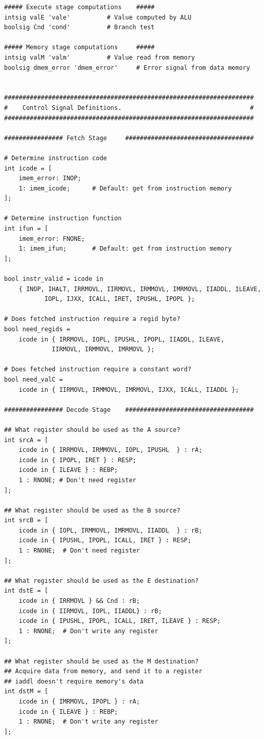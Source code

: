 \documentclass{article}
\begin{document}
\begin{lstlisting}[caption={}]
##### Execute stage computations	#####
intsig valE	'vale'			# Value computed by ALU
boolsig Cnd	'cond'			# Branch test

##### Memory stage computations		#####
intsig valM	'valm'			# Value read from memory
boolsig dmem_error 'dmem_error'		# Error signal from data memory


####################################################################
#    Control Signal Definitions.                                   #
####################################################################

################ Fetch Stage     ###################################

# Determine instruction code
int icode = [
	imem_error: INOP;
	1: imem_icode;		# Default: get from instruction memory
];

# Determine instruction function
int ifun = [
	imem_error: FNONE;
	1: imem_ifun;		# Default: get from instruction memory
];

bool instr_valid = icode in
	{ INOP, IHALT, IRRMOVL, IIRMOVL, IRMMOVL, IMRMOVL, IIADDL, ILEAVE,
	       IOPL, IJXX, ICALL, IRET, IPUSHL, IPOPL };

# Does fetched instruction require a regid byte?
bool need_regids =
	icode in { IRRMOVL, IOPL, IPUSHL, IPOPL, IIADDL, ILEAVE,
		     IIRMOVL, IRMMOVL, IMRMOVL };

# Does fetched instruction require a constant word?
bool need_valC =
	icode in { IIRMOVL, IRMMOVL, IMRMOVL, IJXX, ICALL, IIADDL };

################ Decode Stage    ###################################

## What register should be used as the A source?
int srcA = [
	icode in { IRRMOVL, IRMMOVL, IOPL, IPUSHL  } : rA;
	icode in { IPOPL, IRET } : RESP;
	icode in { ILEAVE } : REBP;
	1 : RNONE; # Don't need register
];

## What register should be used as the B source?
int srcB = [
	icode in { IOPL, IRMMOVL, IMRMOVL, IIADDL  } : rB;
	icode in { IPUSHL, IPOPL, ICALL, IRET } : RESP;
	1 : RNONE;  # Don't need register
];

## What register should be used as the E destination?
int dstE = [
	icode in { IRRMOVL } && Cnd : rB;
	icode in { IIRMOVL, IOPL, IIADDL} : rB;
	icode in { IPUSHL, IPOPL, ICALL, IRET, ILEAVE } : RESP;
	1 : RNONE;  # Don't write any register
];

## What register should be used as the M destination?
## Acquire data from memory, and send it to a register
## iaddl doesn't require memory's data
int dstM = [
	icode in { IMRMOVL, IPOPL } : rA;
	icode in { ILEAVE } : REBP;
	1 : RNONE;  # Don't write any register
];


\end{lstlisting}
\end{document}

